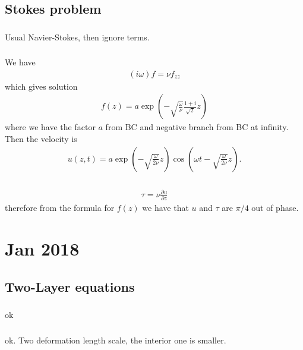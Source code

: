\documentclass[11pt,letterpaper]{book}
\theoremstyle{definition}
\newcommand{\pe}{\partial}
\begin{document}
\section{Stokes problem}
\subsection{}
Usual Navier-Stokes, then ignore terms.

\subsection{}
We have
\begin{align*}
    (i\omega)f = \nu f_{zz}
\end{align*}
which gives solution
\begin{align*}
    f(z) = a\exp\left(-\sqrt{\frac{\omega}{\nu}}\frac{1+i}{\sqrt{2}}z\right)
\end{align*}
where we have the factor $a$ from BC and negative branch from BC at infinity. Then the velocity is
\begin{align*}
    u(z,t) = a\exp\left(-\sqrt{\frac{\omega}{2\nu}}z\right)\cos\left(\omega t-\sqrt{\frac{\omega}{2\nu}}z\right).
\end{align*}

\subsection{}
\begin{align*}
    \tau = \nu\frac{\pe u}{\pe z}
\end{align*}
therefore from the formula for $f(z)$ we have that $u$ and $\tau$ are $\pi/4$ out of phase.

\chapter{Jan 2018}
\section{Two-Layer equations}
\subsection{}
ok

\subsection{}
ok. Two deformation length scale, the interior one is smaller.
\end{document}
